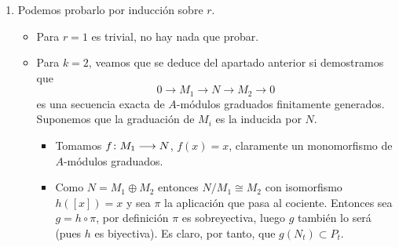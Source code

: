 \documentclass[twoside]{article}
\DeclareMathOperator{\Ima}{Im}
\begin{document}
\begin{solucion}
\begin{itemize}
\begin{solucion}
\begin{enumerate}
\begin{proof} Veamos que se verifican las propiedades.
\begin{itemize} 
\item $P_t,N_t$ y $M_t$ son $k$-e.v. de dimensión finita por el Lema \ref{lemma:1}.
\item Las restricciones de $f$ y $g$ a $M_t$ y $N_t$ respectivamente están bien definidas por la hipótesis de que son homomorfismos de $A$-módulos graduados (Ecuación \ref{eq:1}).
\item $f,g$ son homomorfismos de $k$-e.v. por ser homomorfismos de $A$-módulos, luego las restricciones también lo son. Además, $f$ es inyectiva por hipótesis, por lo que $f|_{M_t}$ también lo es. $g|_{N_t}$ es sobreyectiva por el Lema \ref{lemma:2}.
\item Sabemos que $\Ima(f)=\ker g$. Es claro que $\Ima(f|_{M_t})= \Ima(f)\cap N_t$. Una contención es trivial, sea $x\in \Ima(f)\cap N_t$, si no estuviese en $M_t$ podríamos razonar como en el Lema 2. Por definición, $\ker{g|_{N_t}}=\ker g \cap N_t$, luego
$$
\Ima(f|_{M_t})= \Ima(f)\cap N_t =\ker g \cap N_t = \ker{g|_{N_t}}
$$
\end{itemize}
\end{proof}
Una consecuencia inmediata del Lema \ref{lemma:3} es que $P_t \cong N_t/f(M_t)$, luego 
 $$
\dim_k(P_t) = \dim_k(N_t)-\dim_k(f(M_t)) \overset{\text{f inyectiva}}{=} \dim_k(N_t)-\dim_k(M_t)
$$
$$\phi_P(t) = \phi_N(t)-\phi_M(t) \Rightarrow \phi_N(t)=\phi_M(t)+\phi_P(t)$$
\item Podemos probarlo por inducción sobre $r$. 
\begin{itemize}
\item Para $r=1$ es trivial, no hay nada que probar. 
\item Para $k=2$, veamos que se deduce del apartado anterior si demostramos que 
$$
0\to M_1 \to N \to M_2 \to 0$$
es una secuencia exacta de $A$-módulos graduados finitamente generados. Suponemos que la graduación de $M_i$ es la inducida por $N$.
\begin{itemize}
\item Tomamos $f\colon{M_1}\longrightarrow{N}$, $f(x)=x$, claramente un monomorfismo de $A$-módulos graduados. 
\item Como $N=M_1\oplus M_2$ entonces $N/M_1\cong M_2$ con isomorfismo $h([x])=x$ y sea $\pi$ la aplicación que pasa al cociente. Entonces sea $g=h \circ \pi$, por definición $\pi$ es sobreyectiva, luego $g$ también lo será (pues $h$ es biyectiva). Es claro, por tanto, que $g(N_t)\subset P_t$. 



\end{itemize}
\end{itemize}
\end{enumerate}
\end{solucion}
\end{itemize}
\end{solucion}
\end{document}
